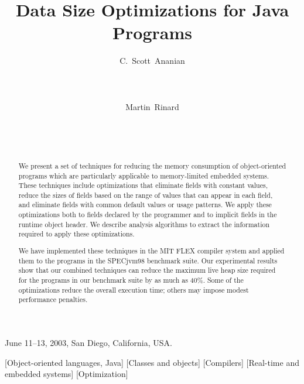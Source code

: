 \documentclass{sig-alt-full}
\begin{document}

 {June 11--13, 2003, San Diego, California, USA.}
\title{Data Size Optimizations for Java Programs}
\author{
\alignauthor C.~Scott~Ananian\\
\\
\\
\\
\alignauthor Martin~Rinard\\
\\
\\
\\
}
\maketitle
{}
%
\begin{abstract}
We present a set of techniques for reducing the memory consumption of
object-oriented programs which are particularly applicable to
memory-limited embedded systems. These techniques 
include optimizations that eliminate fields with
constant values, reduce the sizes of fields based on the range
of values that can appear in each field, and 
eliminate fields with common default values
or usage patterns.
We apply these optimizations both 
to fields declared by the programmer and to implicit fields in
the runtime object header. We describe analysis
algorithms to extract the information required to apply these
optimizations. 

We have implemented these techniques in the MIT FLEX compiler
system and applied them to the programs in the SPECjvm98 
benchmark suite. Our experimental results show that 
our combined techniques can reduce the maximum live heap size required
for the programs in our benchmark suite by as much as 40\%.
Some of the optimizations reduce the overall execution time;
others may impose modest performance penalties.
\end{abstract}
[Object-oriented languages, Java]
[Classes and objects]
[Compilers]
[Real-time and embedded systems]
[Optimization]
%
\end{document}

